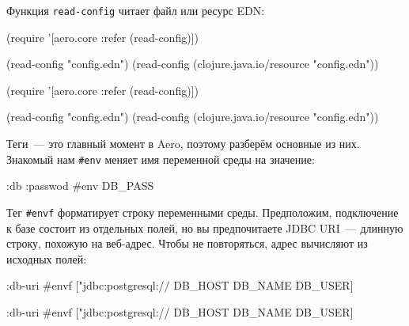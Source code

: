 
Функция \verb|read-config| читает файл или ресурс EDN:

\ifx\devicetype\mobile

\begin{english}
  \begin{clojure}
(require
  '[aero.core :refer (read-config)])

(read-config "config.edn")
(read-config
  (clojure.java.io/resource
    "config.edn"))
  \end{clojure}
\end{english}

\else

\begin{english}
  \begin{clojure}
(require '[aero.core :refer (read-config)])

(read-config "config.edn")
(read-config (clojure.java.io/resource "config.edn"))
  \end{clojure}
\end{english}

\fi


Теги~--- это главный момент в Aero, поэтому разберём основные из них. Знакомый нам
\verb|#env| меняет имя переменной среды на значение:

\begin{english}
  \begin{clojure}
{:db {:passwod #env DB_PASS}}
  \end{clojure}
\end{english}

Тег \verb|#envf| форматирует строку переменными среды. Предположим,
подключение к базе состоит из отдельных полей, но вы предпочитаете JDBC URI~---
длинную строку, похожую на веб-адрес. Чтобы не повторяться, адрес вычисляют из
исходных полей:

\ifx\devicetype\mobile

\begin{english}
  \begin{clojure}
{:db-uri
 #envf ["jdbc:postgresql://%
        DB_HOST DB_NAME DB_USER]}
  \end{clojure}
\end{english}

\else

\begin{english}
  \begin{clojure}
{:db-uri #envf ["jdbc:postgresql://%
                DB_HOST DB_NAME DB_USER]}
  \end{clojure}
\end{english}

